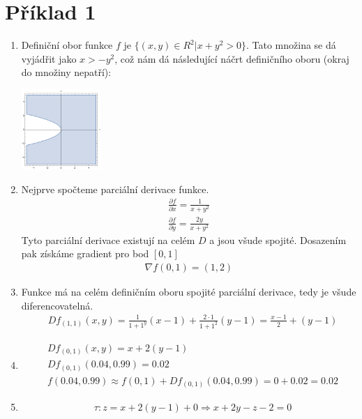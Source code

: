 \documentclass[11pt,a4paper]{article}
\begin{document}
\section*{Příklad 1}
\begin{enumerate}[label=(\alph*)]
\item
Definiční obor funkce $f$ je $\{(x,y) \in R^2 \vert x+y^2 > 0\}$. Tato množina se dá vyjádřit jako $x > -y^2$, což nám dá následující náčrt definičního oboru (okraj do množiny nepatří):\\
\begin{flushright}\includegraphics[width=3cm]{09_def.png}\end{flushright}

\item
Nejprve spočteme parciální derivace funkce.
\begin{align*}
\frac{\partial f}{\partial x} = \frac{1}{x+y^2} \\
\frac{\partial f}{\partial y} = \frac{2y}{x+y^2}
\end{align*}
Tyto parciální derivace existují na celém $D$ a jsou všude spojité. Dosazením pak získáme gradient pro bod $[0,1]$
\begin{align*}
\nabla f(0,1) = (1, 2)
\end{align*} 

\item
Funkce má na celém definičním oboru spojité parciální derivace, tedy je všude diferencovatelná.
\begin{align*}
	& Df_{(1,1)}(x,y) = \frac{1}{1+1^y}(x-1)+\frac{2\cdot 1}{1+1^2}(y-1) = \frac{x-1}{2} + (y-1)
\end{align*}

\item
\begin{align*}
	& Df_{(0,1)}(x,y) = x+2(y-1)\\
	& Df_{(0,1)}(0.04,0.99) = 0.02\\
	& f(0.04,0.99) \approx f(0,1) + Df_{(0,1)}(0.04,0.99) = 0 + 0.02 = 0.02 
\end{align*}

\item
\begin{align*}
	& \tau : z = x + 2(y-1) + 0 \Rightarrow x + 2y - z - 2 = 0
\end{align*}
\end{enumerate}
\end{document}
